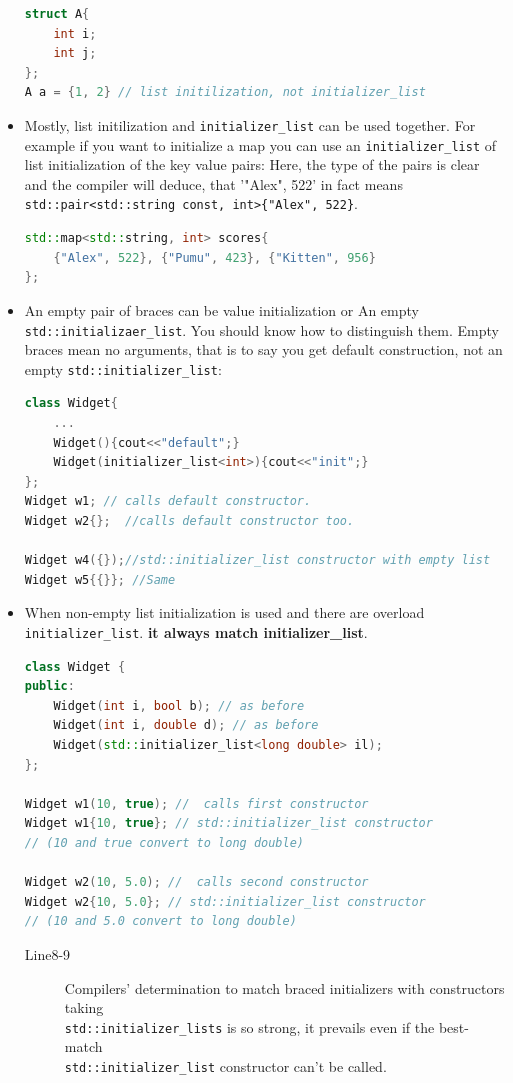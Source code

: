 \documentclass[a4paper,11pt,twoside]{book}
\begin{document}
\begin{itemize}
\begin{lstlisting}[frame=single, language=c++,mathescape=true]
struct A{
	int i;
	int j;
};	
A a = {1, 2} // list initilization, not initializer_list
\end{lstlisting}
	
	\item Mostly, list initilization and \texttt{initializer\_list} can be used together. For example if you want to initialize a map you can use an \texttt{initializer\_list} of list initialization of the key value pairs: Here, the type of the pairs is clear and the compiler will deduce, that '{"Alex", 522}' in fact means \texttt{std::pair<std::string const, int>\{"Alex", 522\}}.
	
\begin{lstlisting}[frame=single, language=c++,mathescape=true]
std::map<std::string, int> scores{ 
	{"Alex", 522}, {"Pumu", 423}, {"Kitten", 956} 
};
\end{lstlisting}

	\item An empty pair of braces can be value initialization or An empty \texttt{std::initializaer\_list}. You should know how to distinguish them.  Empty braces mean no arguments, that is to say you get default construction, not an empty \texttt{std::initializer\_list}:
\begin{lstlisting}[frame=single, language=c++,mathescape=true]
class Widget{
	...
	Widget(){cout<<"default";}
	Widget(initializer_list<int>){cout<<"init";}
};
Widget w1; // calls default constructor.
Widget w2{};  //calls default constructor too.
	
Widget w4({});//std::initializer_list constructor with empty list 
Widget w5{{}}; //Same
\end{lstlisting}
	
	\item When non-empty list initialization is used and there are overload \texttt{initializer\_list}.
	\textbf{it always match initializer\_list}.
\begin{lstlisting}[frame=single, language=c++,mathescape=true]
class Widget {
public:
	Widget(int i, bool b); // as before
	Widget(int i, double d); // as before
	Widget(std::initializer_list<long double> il);
};
	
Widget w1(10, true); //  calls first constructor
Widget w1{10, true}; // std::initializer_list constructor
// (10 and true convert to long double)

Widget w2(10, 5.0); //  calls second constructor
Widget w2{10, 5.0}; // std::initializer_list constructor
// (10 and 5.0 convert to long double)
\end{lstlisting}
\begin{description}
    \item[Line8-9] Compilers' determination to match braced initializers with constructors taking \\ \texttt{std::initializer\_lists} is so strong, it prevails even if the best-match \\ \texttt{std::initializer\_list} constructor can't be called.
\end{description}
	

\end{itemize}
\end{document}
